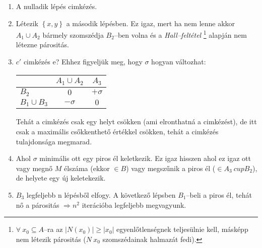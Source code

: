 \begin{enumerate}
  \item A nulladik lépés cimkézés.
  \item Létezik $\left\{x,y\right\}$ a második lépésben. Ez igaz, mert ha nem
  lenne akkor $A_1 \cup A_2$ bármely szomszédja $B_2$--ben volna és a
  \emph{Hall--feltétel} \footnote{$ \forall~x_0 \subseteq A$--ra az $|N(x_0)|
  \geq |x_0|$ egyenlőtlenségnek teljesülnie kell, másképp nem létezik párositás
  ($N~x_0$ szomszédainak halmazát fedi).} alapján nem létezne párositás.
  \item $c'$ cimkézés e? Ehhez figyeljük meg, hogy $\sigma$ hogyan változhat:
  
  \begin{tabular}{ l |  c c }
                  & $A_1 \cup A_2$ & $A_3$ \\
                  \hline
  $B_2$           & $0$            & $+\sigma$ \\
  $B_1 \cup B_3$ & $-\sigma$      & $0$ \\
  \end{tabular}
  
  Tehát a cimkézés csak egy helyt csökken (ami elronthatná a cimkézést), de itt
  csak a maximális csőkkenthető értékkel csökken, tehát a cimkézés tulajdonsága 
  megmarad.
  \item Ahol $\sigma$ minimális ott egy piros él keletkezik. Ez igaz hisszen ahol ez
  igaz ott vagy megnő $M$ élszáma (ekkor $\in B$) vagy megszűnik a piros él
  ($\in A_3 \ cup B_2$), de helyete egy új keletekezik.
  \item $B_3$ legfeljebb n lépésből elfogy. A következő lépsben $B_1$--beli a
  piros él, tehát nő a párositás $\Rightarrow n^2$ iterációba legfeljebb
  megvagyunk.
  \end{enumerate}